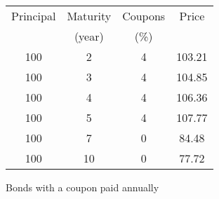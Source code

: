 \begin{figure}
\centering			
\begin{tabular}{cccc}						
Principal	&	Maturity	&	Coupons	&	Price	\\
    & (year) & (\%) & \\
\hline
100	&	2	&	4	&	103.21	\\
100	&	3	&	4	&	104.85	\\
100	&	4	&	4	&	106.36	\\
100	&	5	&	4	&	107.77	\\
100	&	7	&	0	&	84.48	\\
100	&	10	&	0	&	77.72	\\
\end{tabular}
\caption{Bonds with a coupon paid annually}
\label{annually}
\end{figure}

